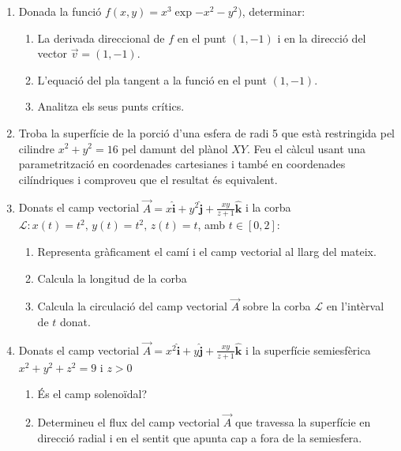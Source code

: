 \documentclass[]{book}
\newcommand\uvec[1]{\textbf{#1}}
\begin{document}
\begin{enumerate}
  \item Donada la funció $f(x,y)=x^3 \exp{-x^2-y^2)}$, determinar:
  \begin{enumerate}
    \item La derivada direccional de $f$ en el punt $(1,-1)$ i en la direcció del vector $\vec{v}=(1,-1)$.
    \item L'equació del pla tangent a la funció en el punt $(1,-1)$.
    \item Analitza els seus punts crítics.
  \end{enumerate}

  \item Troba la superfície de la porció d'una esfera de radi 5 que està restringida pel cilindre $x^2+y^2=16$ pel damunt del plànol $XY$. Feu el càlcul usant una parametrització en coordenades cartesianes i també en coordenades cilíndriques i comproveu que el resultat és equivalent.

  \item Donats el camp vectorial $\vec{A}=x \hat{\uvec{i}}+y^2\hat{\uvec{j}}+\frac{xy}{z+1}\hat{\uvec{k}}$ i la corba $\mathcal{L}: x(t)=t^2, \, y(t)=t^2, \, z(t)=t$, amb $t\in [0,2]$:
  \begin{enumerate}
    \item Representa gràficament el camí i el camp vectorial al llarg del mateix.
    \item Calcula la longitud de la corba
    \item Calcula la circulació del camp vectorial $\vec{A}$ sobre la corba $\mathcal{L}$ en l'intèrval de $t$ donat.
  \end{enumerate}

  \item Donats el camp vectorial $\vec{A}=x^2 \hat{\uvec{i}}+y\hat{\uvec{j}}+\frac{xy}{z+1}\hat{\uvec{k}}$ i la superfície semiesfèrica $x^2+y^2+z^2=9$ i $z>0$
\begin{enumerate}
  \item És el camp solenoïdal?
  \item Determineu el flux del camp vectorial $\vec{A}$ que travessa la superfície en direcció radial i en el sentit que apunta cap a fora de la semiesfera.
\end{enumerate}


\end{enumerate}
\end{document}
